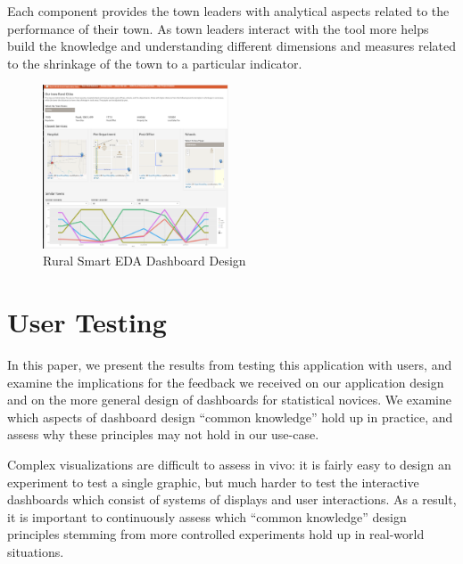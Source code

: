 \documentclass[10pt]{article}\usepackage[]{graphicx}\usepackage[]{color}
\begin{document}
Each component provides the town leaders with analytical aspects related to the performance of their town. As town leaders interact with the tool more helps build the knowledge and understanding different dimensions and measures related to the shrinkage of the town to a particular indicator.

\begin{figure}[ht!]
\centering
\includegraphics[width=55mm]{SCC_Dashboard_pcp2.png}
\caption{Rural Smart EDA Dashboard Design}
\end{figure}

\section{User Testing}
In this paper, we present the results from testing this application with users, and examine the implications for the feedback we received on our application design and on the more general design of dashboards for statistical novices. We examine which aspects of dashboard design ``common knowledge'' hold up in practice, and assess why these principles may not hold in our use-case. 

Complex visualizations are difficult to assess in vivo: it is fairly easy to design an experiment to test a single graphic, but much harder to test the interactive dashboards which consist of systems of displays and user interactions. As a result, it is important to continuously assess which ``common knowledge'' design principles stemming from more controlled experiments hold up in real-world situations.
\end{document}
